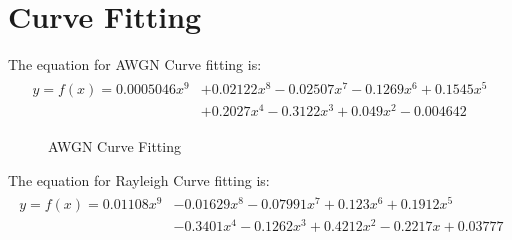 \section{Curve Fitting}



The equation for AWGN Curve fitting is:
\begin{align*}
	\begin{split}
y=f(x) = 0.0005046x^9 &+ 0.02122x^8 -0.02507x^7 - 0.1269x^6 + 0.1545x^5\\ &+ 0.2027x^4 - 0.3122x^3 + 0.049 x^2 - 0.004642
\end{split}
\end{align*}
\begin{mathDef}
\end{mathDef}
 
\begin{figure}[htpb!]
	\centerline{}
	\caption{AWGN Curve Fitting}
	\label{fig:awgn_fit}
\end{figure}

\pagebreak


The equation for Rayleigh Curve fitting is:
\begin{align*}
\begin{split}
y=f(x) = 0.01108x^9 &- 0.01629x^8 - 0.07991x^7 + 0.123x^6 + 0.1912x^5\\& - 0.3401x^4 - 0.1262x^3 + 0.4212x^2 - 0.2217x + 0.03777
\end{split}
\end{align*}


